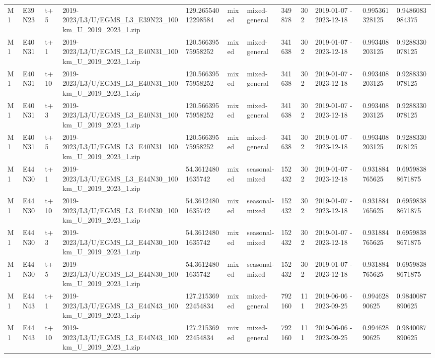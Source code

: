 \begin{landscape}
\begin{longtable}{llllllllllll}
M1 & E39N23 & t+5 & 2019-2023/L3/U/EGMS\_L3\_E39N23\_100km\_U\_2019\_2023\_1.zip & 129.26554012298584 & mixed & mixed-general & 349878 & 302 & 2019-01-07 - 2023-12-18 & 0.995361328125 & 0.9486083984375 \\
M1 & E40N31 & t+1 & 2019-2023/L3/U/EGMS\_L3\_E40N31\_100km\_U\_2019\_2023\_1.zip & 120.56639575958252 & mixed & mixed-general & 341638 & 302 & 2019-01-07 - 2023-12-18 & 0.993408203125 & 0.9288330078125 \\
M1 & E40N31 & t+10 & 2019-2023/L3/U/EGMS\_L3\_E40N31\_100km\_U\_2019\_2023\_1.zip & 120.56639575958252 & mixed & mixed-general & 341638 & 302 & 2019-01-07 - 2023-12-18 & 0.993408203125 & 0.9288330078125 \\
M1 & E40N31 & t+3 & 2019-2023/L3/U/EGMS\_L3\_E40N31\_100km\_U\_2019\_2023\_1.zip & 120.56639575958252 & mixed & mixed-general & 341638 & 302 & 2019-01-07 - 2023-12-18 & 0.993408203125 & 0.9288330078125 \\
M1 & E40N31 & t+5 & 2019-2023/L3/U/EGMS\_L3\_E40N31\_100km\_U\_2019\_2023\_1.zip & 120.56639575958252 & mixed & mixed-general & 341638 & 302 & 2019-01-07 - 2023-12-18 & 0.993408203125 & 0.9288330078125 \\
M1 & E44N30 & t+1 & 2019-2023/L3/U/EGMS\_L3\_E44N30\_100km\_U\_2019\_2023\_1.zip & 54.36124801635742 & mixed & seasonal-mixed & 152432 & 302 & 2019-01-07 - 2023-12-18 & 0.931884765625 & 0.69598388671875 \\
M1 & E44N30 & t+10 & 2019-2023/L3/U/EGMS\_L3\_E44N30\_100km\_U\_2019\_2023\_1.zip & 54.36124801635742 & mixed & seasonal-mixed & 152432 & 302 & 2019-01-07 - 2023-12-18 & 0.931884765625 & 0.69598388671875 \\
M1 & E44N30 & t+3 & 2019-2023/L3/U/EGMS\_L3\_E44N30\_100km\_U\_2019\_2023\_1.zip & 54.36124801635742 & mixed & seasonal-mixed & 152432 & 302 & 2019-01-07 - 2023-12-18 & 0.931884765625 & 0.69598388671875 \\
M1 & E44N30 & t+5 & 2019-2023/L3/U/EGMS\_L3\_E44N30\_100km\_U\_2019\_2023\_1.zip & 54.36124801635742 & mixed & seasonal-mixed & 152432 & 302 & 2019-01-07 - 2023-12-18 & 0.931884765625 & 0.69598388671875 \\
M1 & E44N43 & t+1 & 2019-2023/L3/U/EGMS\_L3\_E44N43\_100km\_U\_2019\_2023\_1.zip & 127.21536922454834 & mixed & mixed-general & 792160 & 111 & 2019-06-06 - 2023-09-25 & 0.99462890625 & 0.9840087890625 \\
M1 & E44N43 & t+10 & 2019-2023/L3/U/EGMS\_L3\_E44N43\_100km\_U\_2019\_2023\_1.zip & 127.21536922454834 & mixed & mixed-general & 792160 & 111 & 2019-06-06 - 2023-09-25 & 0.99462890625 & 0.9840087890625 \\

\end{longtable}
\end{landscape}
